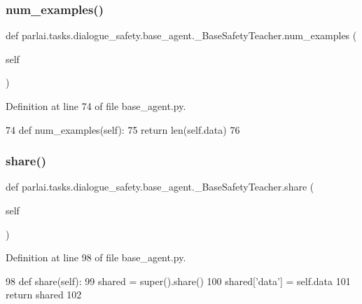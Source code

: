 \subsubsection{\texorpdfstring{num\+\_\+examples()}{num\_examples()}}
{\footnotesize\ttfamily def parlai.\+tasks.\+dialogue\+\_\+safety.\+base\+\_\+agent.\+\_\+\+Base\+Safety\+Teacher.\+num\+\_\+examples (\begin{DoxyParamCaption}\item[{}]{self }\end{DoxyParamCaption})}



Definition at line 74 of file base\+\_\+agent.\+py.


\begin{DoxyCode}
74     \textcolor{keyword}{def }num\_examples(self):
75         \textcolor{keywordflow}{return} len(self.data)
76 
\end{DoxyCode}
\mbox{\label{classparlai_1_1tasks_1_1dialogue__safety_1_1base__agent_1_1__BaseSafetyTeacher_a563ca65dea3b938cf25a4e4853d23c62}} 
\subsubsection{\texorpdfstring{share()}{share()}}
{\footnotesize\ttfamily def parlai.\+tasks.\+dialogue\+\_\+safety.\+base\+\_\+agent.\+\_\+\+Base\+Safety\+Teacher.\+share (\begin{DoxyParamCaption}\item[{}]{self }\end{DoxyParamCaption})}



Definition at line 98 of file base\+\_\+agent.\+py.


\begin{DoxyCode}
98     \textcolor{keyword}{def }share(self):
99         shared = super().share()
100         shared[\textcolor{stringliteral}{'data'}] = self.data
101         \textcolor{keywordflow}{return} shared
102 \end{DoxyCode}


